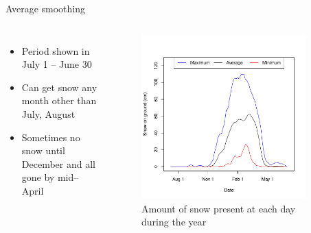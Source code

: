 \documentclass{beamer}
\begin{document}
\begin{frame}{Average smoothing}

\begin{columns}


{\small
\begin{itemize}
\item Period shown in July 1 -- June 30
\item Can get snow any month other than July, August
\item Sometimes no snow until December and all gone by mid--April
\end{itemize}
}

\vspace{30mm}


\vspace{-18mm}
\begin{figure}
\includegraphics[width=0.9\textwidth]{report-averagetsplot}
\vspace{-2mm}
\caption{{\footnotesize Amount of snow present at each day during the year}}
\vspace{10mm}
\end{figure}

\end{columns}

\end{frame}
\end{document}
